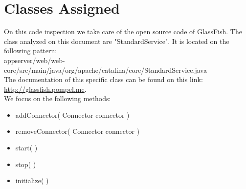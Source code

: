 \documentclass[../../dd.tex]{subfiles}
\begin{document}
	\chapter{Classes Assigned}
	
	On this code inspection we take care of the open source code of GlassFish.
	The class analyzed on this document are "StandardService". It is located on the following pattern: \\ appserver/web/web-core/src/main/java/org/apache/catalina/core/StandardService.java \\
	The documentation of this specific class can be found on this link: \\ \url{http://glassfish.pompel.me}. \\
	We focus on the following methods:
	\begin{itemize}
	\item addConnector( Connector connector )
	
	\item removeConnector( Connector connector )
	
	\item start( )
	
	\item stop( )
	
	\item initialize( )
	
	
	\end{itemize}
	
	
\end{document}
